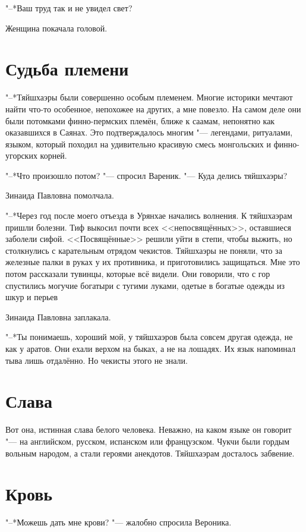 "--*Ваш труд так и не увидел свет?

Женщина покачала головой.

\section{Судьба племени}

"--*Тяйшхаэры были совершенно особым племенем.
Многие историки мечтают найти что-то особенное, непохожее на других, а мне повезло.
На самом деле они были потомками финно-пермских племён, ближе к саамам, непонятно как оказавшихся в Саянах.
Это подтверждалось многим "--- легендами, ритуалами, языком, который походил на удивительно красивую смесь монгольских и финно-угорских корней.

"--*Что произошло потом? "--- спросил Вареник.
"--- Куда делись тяйшхаэры?

Зинаида Павловна помолчала.

"--*Через год после моего отъезда в Урянхае начались волнения.
К тяйшхаэрам пришли болезни.
Тиф выкосил почти всех <<непосвящённых>>, оставшиеся заболели сифой.
<<Посвящённые>> решили уйти в степи, чтобы выжить, но столкнулись с карательным отрядом чекистов.
Тяйшхаэры не поняли, что за железные палки в руках у их противника, и приготовились защищаться.
Мне это потом рассказали тувинцы, которые всё видели.
Они говорили, что с гор спустились могучие богатыри с тугими луками, одетые в богатые одежды из шкур и перьев\ldotst

Зинаида Павловна заплакала.

"--*Ты понимаешь, хороший мой, у тяйшхаэров была совсем другая одежда, не как у аратов.
Они ехали верхом на быках, а не на лошадях.
Их язык напоминал тыва лишь отдалённо.
Но чекисты этого не знали.

\section{Слава}

Вот она, истинная слава белого человека.
Неважно, на каком языке он говорит "--- на английском, русском, испанском или французском.
Чукчи были гордым вольным народом, а стали героями анекдотов.
Тяйшхаэрам досталось забвение.

\section{Кровь}

"--*Можешь дать мне крови? "--- жалобно спросила Вероника.

